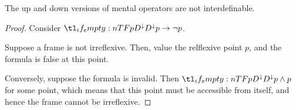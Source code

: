 \documentclass[10pt]{article}
\begin{document}
\begin{proposition}
  The up and down versions of mental operators are not interdefinable.
  \begin{proof}
    Consider \(\ldesd{p} \rightarrow \lnot p\).

    Suppose a frame is not irreflexive. Then, value the relflexive point \(p\), and the formula is false at this point.

    Conversely, suppose the formula is invalid.
    Then \(\ldesd{p} \land p\) for some point, which means that this point must be accessible from itself, and hence the frame cannot be irreflexive.
  \end{proof}
\end{proposition}
\end{document}
